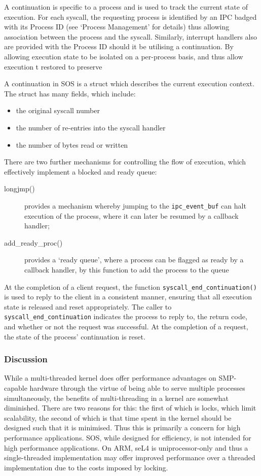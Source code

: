 \documentclass[a4paper,12pt]{article}
\begin{document}
A continuation is specific to a process and is used to track the current state
of execution.  For each syscall, the requesting process is identified by an
IPC badged with its Process ID (see `Process Management' for details) thus
allowing association between the process and the syscall.  Similarly,
interrupt handlers also are provided with the Process ID should it be
utilising a continuation.  By allowing execution state to be isolated on a
per-process basis, and thus allow execution t restored to preserve

A continuation in SOS is a struct which describes the current execution
context.  The struct has many fields, which include:

\begin{itemize}
\item the original syscall number
\item the number of re-entries into the syscall handler
\item the number of bytes read or written
\end{itemize}

There are two further mechanisms for controlling the flow of execution, which
effectively implement a blocked and ready queue:
\begin{description}
\item[longjmp()] provides a mechanism whereby jumping to the \texttt{ipc\_event\_buf}
  can halt execution of the process, where it can later be resumed by a
  callback handler;
\item[add\_ready\_proc()] provides a `ready queue', where a process can be
  flagged as ready by a callback handler, by this function to add the process
  to the queue
\end{description}

At the completion of a client request, the function
\texttt{syscall\_end\_continuation()} is used to reply to the client in a
consistent manner, ensuring that all execution state is released and reset
appropriately.  The caller to \texttt{syscall\_end\_continuation} indicates
the process to reply to, the return code, and whether or not the request was
successful.  At the completion of a request, the state of the process'
continuation is reset.

\subsubsection{Discussion}
While a multi-threaded kernel does offer performance advantages on SMP-capable
hardware through the virtue of being able to serve multiple processes
simultaneously, the benefits of multi-threading in a kernel are somewhat
diminished.  There are two reasons for this: the first of which is locks,
which limit scalability, the second of which is that time spent in the kernel
should be designed such that it is minimised.  Thus this is primarily a
concern for high performance applications.  SOS, while designed for
efficiency, is not intended for high performance applications.  On ARM, seL4
is uniprocessor-only and thus a single-threaded implementation may offer
improved performance over a threaded implementation due to the costs imposed
by locking.
\end{document}
